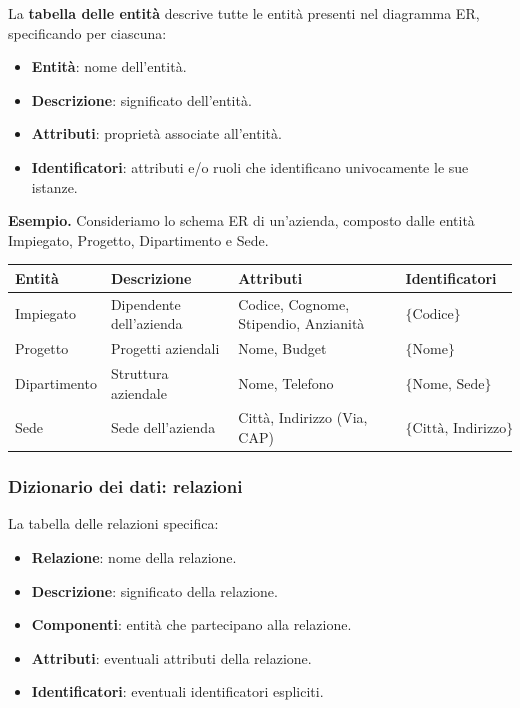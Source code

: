 \noindent
La \textbf{tabella delle entità} descrive tutte le entità presenti
nel diagramma ER, specificando per ciascuna:
\begin{itemize}
    \item \textbf{Entità}: nome dell'entità.
    \item \textbf{Descrizione}: significato dell'entità.
    \item \textbf{Attributi}: proprietà associate all'entità.
    \item \textbf{Identificatori}: attributi e/o ruoli che
    identificano univocamente le sue istanze.
\end{itemize}

\noindent
\textcolor{verdeEsempio}{\textbf{Esempio. }}
Consideriamo lo schema ER di un'azienda, composto dalle entità
Impiegato, Progetto, Dipartimento e Sede.

\begin{center}
\noindent
\small
\renewcommand{\arraystretch}{1.4}
\begin{tabular}{|p{2.3cm}|p{2.7cm}|p{3.3cm}|p{3.1cm}|}
\hline
\textbf{Entità} &
\textbf{Descrizione} &
\textbf{Attributi} &
\textbf{Identificatori} \\
\hline

Impiegato &
Dipendente dell'azienda &
Codice, Cognome, Stipendio, Anzianità &
$\{\text{Codice}\}$ \\
\hline

Progetto &
Progetti aziendali &
Nome, Budget &
$\{\text{Nome}\}$ \\
\hline

Dipartimento &
Struttura aziendale &
Nome, Telefono &
$\{\text{Nome, Sede}\}$ \\
\hline

Sede &
Sede dell'azienda &
Città, Indirizzo (Via, CAP) &
$\{\text{Città, Indirizzo}\}$ \\
\hline

\end{tabular}
\end{center}


\subsubsection*{Dizionario dei dati: relazioni}

\noindent
La tabella delle relazioni specifica:
\begin{itemize}
    \item \textbf{Relazione}: nome della relazione.
    \item \textbf{Descrizione}: significato della relazione.
    \item \textbf{Componenti}: entità che partecipano alla relazione.
    \item \textbf{Attributi}: eventuali attributi della relazione.
    \item \textbf{Identificatori}: eventuali identificatori espliciti.
\end{itemize}

